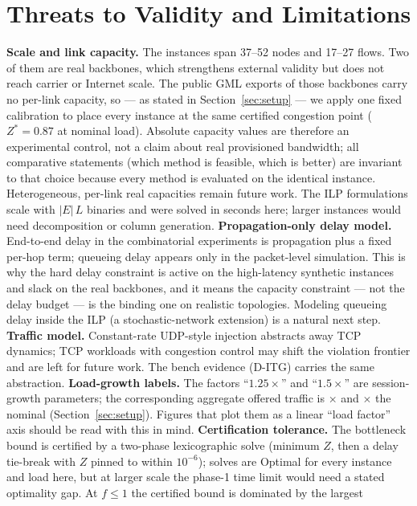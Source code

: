 \documentclass[journal]{IEEEtran}
\begin{document}
\section{Threats to Validity and Limitations}
\label{sec:limits}
\textbf{Scale and link capacity.} The instances span 37--52 nodes and 17--27
flows. Two of them are real backbones, which strengthens external validity but
does not reach carrier or Internet scale. The public GML exports of those
backbones carry no per-link capacity, so --- as stated in
Section~\ref{sec:setup} --- we apply one fixed calibration to place every
instance at the same certified congestion point ($Z^{*}=0.87$ at nominal
load). Absolute capacity values are therefore an experimental control, not a
claim about real provisioned bandwidth; all comparative statements (which
method is feasible, which is better) are invariant to that choice because
every method is evaluated on the identical instance. Heterogeneous,
per-link real capacities remain future work. The ILP formulations scale with
$|E|\,L$ binaries and were solved in seconds here; larger instances would need
decomposition or column generation.
\textbf{Propagation-only delay model.} End-to-end delay in the combinatorial
experiments is propagation plus a fixed per-hop term; queueing delay appears
only in the packet-level simulation. This is why the hard delay constraint is
active on the high-latency synthetic instances and slack on the real
backbones, and it means the capacity constraint --- not the delay budget ---
is the binding one on realistic topologies. Modeling queueing delay inside the
ILP (a stochastic-network extension) is a natural next step.
\textbf{Traffic model.} Constant-rate UDP-style injection abstracts away TCP
dynamics; TCP workloads with congestion control may shift the violation
frontier and are left for future work. The bench evidence (D-ITG) carries
the same abstraction.
\textbf{Load-growth labels.} The factors ``$1.25\times$'' and
``$1.5\times$'' are session-growth parameters; the corresponding aggregate
offered traffic is \LoadRatioHigh$\times$ and \LoadRatioMax$\times$ the
nominal (Section~\ref{sec:setup}). Figures that plot them as a linear
``load factor'' axis should be read with this in mind.
\textbf{Certification tolerance.} The bottleneck bound is certified by a
two-phase lexicographic solve (minimum $Z$, then a delay tie-break with $Z$
pinned to within $10^{-6}$); solves are Optimal for every instance and load
here, but at larger scale the phase-1 time limit would need a stated
optimality gap. At $f\le 1$ the certified bound is dominated by the largest
\end{document}

